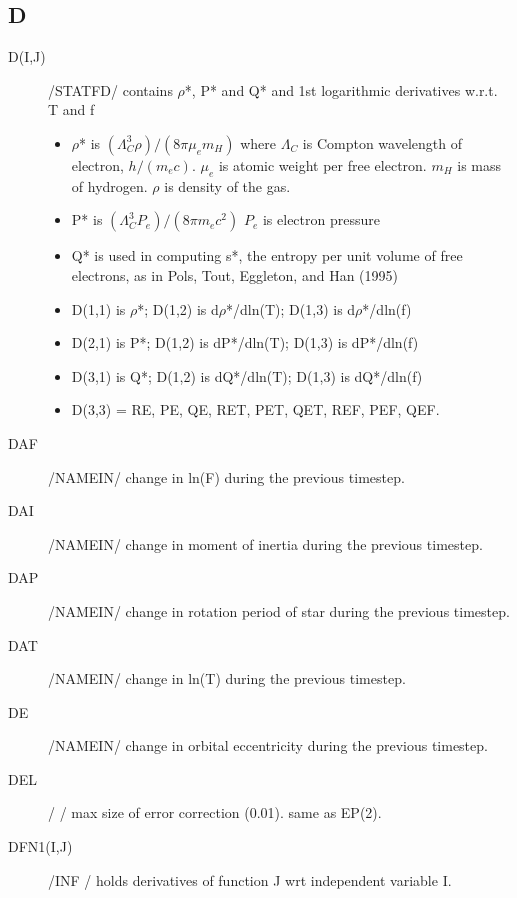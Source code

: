 \documentclass{article}
\begin{document}
\subsection*{D}
\begin{description}
	\item[D(I,J)]		/STATFD/ contains $\rho$*, P* and Q* and 1st logarithmic derivatives w.r.t. T and f
		\begin{itemize}
					\item $\rho$* is $(\Lambda_C^3 \rho)/(8 \pi \mu_e m_H)$
						where $\Lambda_C$ is Compton wavelength of electron, $h/(m_e c)$.
						$\mu_e$ is atomic weight per free electron.
						$m_H$ is mass of hydrogen.
						$\rho$ is density of the gas.
					\item P* is $(\Lambda_C^3 P_e)/(8 \pi m_e c^2)$
						$P_e$ is electron pressure
					\item Q* is used in computing s*, the entropy per unit volume of free electrons,
						as in Pols, Tout, Eggleton, and Han (1995)
					\item D(1,1) is $\rho$*; D(1,2) is d$\rho$*/dln(T); D(1,3) is d$\rho$*/dln(f)
					\item D(2,1) is P*;   D(1,2) is dP*/dln(T);   D(1,3) is dP*/dln(f)
					\item D(3,1) is Q*;   D(1,2) is dQ*/dln(T);   D(1,3) is dQ*/dln(f)
					\item D(3,3) = RE, PE, QE, RET, PET, QET, REF, PEF, QEF.
		\end{itemize}
					
    \item[DAF]     	/NAMEIN/ change in ln(F) during the previous timestep.

    \item[DAI]     	/NAMEIN/ change in moment of inertia during the previous timestep.

    \item[DAP]     	/NAMEIN/ change in rotation period of star during the previous timestep.

    \item[DAT]     	/NAMEIN/ change in ln(T) during the previous timestep.

   	\item[DE]     	 	/NAMEIN/ change in orbital eccentricity during the previous timestep.

	\item[DEL]		    /      / max size of error correction (0.01).  same as EP(2).
					
	\item[DFN1(I,J)]   /INF   / holds derivatives of function J wrt independent variable I.


\end{description}
\end{document}
